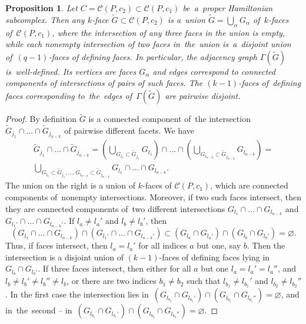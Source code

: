 \documentclass[12pt]{amsart}
\newtheorem{proposition}[formula]{Proposition}
\theoremstyle{definition}
\theoremstyle{remark}
\begin{document}
\begin{proposition}\label{prop:Gtilde}
Let $C=\mathcal{C}(P,c_2)\subset\mathcal{C}(P,c_1)$ be~a~proper Hamiltonian subcomplex.
Then any $k$-face $\widetilde{G}\subset \mathcal{C}(P,c_2)$ is a~union 
$\widetilde{G}=\bigcup_{\alpha}G_\alpha$ of~$k$-faces of~$\mathcal{C}(P,c_1)$, 
where the intersection of any three faces in the union is empty,
while each nonempty intersection of two faces in~the~union is~a~disjoint union of~$(q-1)$-faces of defining faces. 
In particular, the adjacency graph $\Gamma(\widetilde{G})$ is~well-defined. Its vertices are faces $G_\alpha$
and edges correspond to connected components of intersections of pairs of such faces. The $(k-1)$-faces
of~defining faces corresponding to~the~edges of~$\Gamma(\widetilde{G})$ are pairwise disjoint.
\end{proposition}
\begin{proof}
By definition  $\widetilde{G}$ is a connected component of~the intersection 
$\widetilde{G}_{j_1}\cap\dots\cap \widetilde{G}_{j_{n-k}}$ of  pairwise different facets.
We have 
\begin{gather*}
\widetilde{G}_{j_1}\cap \dots\cap \widetilde{G}_{j_{n-k}}=\left(\bigcup\limits_{G_{l_1}\subset \widetilde{G}_{j_1}}G_{l_1}\right)\cap
\dots\cap \left(\bigcup\limits_{G_{l_{n-k}}\subset \widetilde{G}_{j_{n-k}}}G_{l_{n-k}}\right)=\\
\bigcup\limits_{G_{l_1}\subset \widetilde{G}_{j_1},\dots, G_{l_{n-k}}\subset \widetilde{G}_{j_{n-k}}}G_{l_1}\cap \dots\cap G_{l_{n-k}}.
\end{gather*}
The union on the right is a union of $k$-faces of $\mathcal{C}(P,c_1)$, which are connected components 
of~nonempty intersections. Moreover, if two such faces intersect, then they are connected components
of~two different intersections $G_{l_1}\cap \dots\cap G_{l_{n-k}}$ and $G_{l_1'}\cap \dots\cap G_{l_{n-k}'}$.
If $l_a\ne l_a'$ and $l_b\ne l_b'$, then 
$$
\left(G_{l_1}\cap \dots\cap G_{l_{n-k}}\right)\cap \left(G_{l_1'}\cap \dots\cap G_{l_{n-k}'}\right)\subset 
\left(G_{l_a}\cap G_{l_a'}\right)\cap \left(G_{l_b}\cap G_{l_b'}\right)=\varnothing.
$$ 
Thus, if faces intersect, then $l_a=l_a'$ for all indices $a$ but one, say $b$. Then
the intersection is a disjoint union of $(k-1)$-faces of defining faces lying in $G_{l_b}\cap G_{l_b'}$. 
If three faces intersect, then either for all $a$ but one $l_a=l_a'=l_a''$, and 
$l_b\ne l_b'\ne l_b''\ne l_b$, or there are two indices $b_1\ne b_2$ such that $l_{b_1}\ne l_{b_1}'$
and $l_{b_2}\ne l_{b_2}''$. In the first case the intersection lies 
in~$(G_{l_{b_1}}\cap G_{l_{b_1}'})\cap (G_{l_{b_1}}\cap G_{l_{b_1}''})=\varnothing$,
and in~the~second -- in~$(G_{l_{b_1}}\cap G_{l_{b_1}'})\cap (G_{l_{b_2}}\cap G_{l_{b_2}''})=\varnothing$. 
\end{proof}
\end{document}

